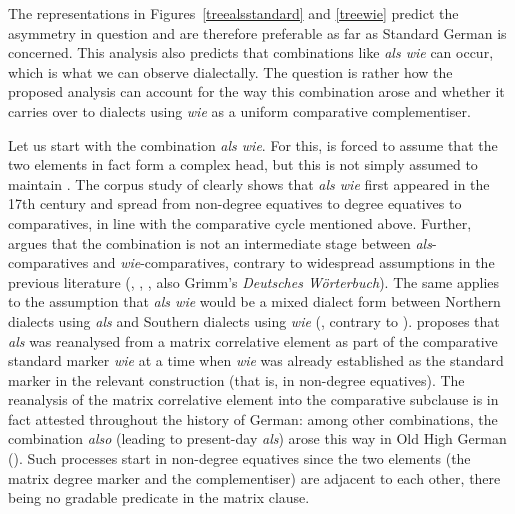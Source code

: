 The representations in Figures~\ref{treealsstandard} and \ref{treewie} predict the asymmetry in question and are therefore preferable as far as Standard German is concerned. This analysis also predicts that combinations like \textit{als wie} can occur, which is what we can observe dialectally. The question is rather how the proposed analysis can account for the way this combination arose and whether it carries over to dialects using \textit{wie} as a uniform comparative complementiser.

Let us start with the combination \textit{als wie}. For this, \citet[366]{jaeger2018} is forced to assume that the two elements in fact form a complex head, but this is not simply assumed to maintain . The corpus study of \citet{jaeger2018} clearly shows that \textit{als wie} first appeared in the 17th century and spread from non-degree equatives to degree equatives to comparatives, in line with the comparative cycle mentioned above. Further, \citet[255--259]{jaeger2018} argues that the combination is not an intermediate stage between \textit{als}-comparatives and \textit{wie}-comparatives, contrary to widespread assumptions in the previous literature (\citealt{jaeger2010}, \citealt{feldmann1901}, \citealt{dueckert1961}, also Grimm's \textit{Deutsches Wörterbuch}). The same applies to the assumption that \textit{als wie} would be a mixed dialect form between Northern dialects using \textit{als} and Southern dialects using \textit{wie} (\citealt[298]{jaeger2018}, contrary to \citealt{lipold1983}). \citet{jaeger2018} proposes that \textit{als} was reanalysed from a matrix correlative element as part of the comparative standard marker \textit{wie} at a time when \textit{wie} was already established as the standard marker in the relevant construction (that is, in non-degree equatives). The reanalysis of the matrix correlative element into the comparative subclause is in fact attested throughout the history of German: among other combinations, the combination \textit{also} (leading to present-day \textit{als}) arose this way in Old High German (\citealt[71--75]{jaeger2018}). Such processes start in non-degree equatives since the two elements (the matrix degree marker and the complementiser) are adjacent to each other, there being no gradable predicate in the matrix clause.

